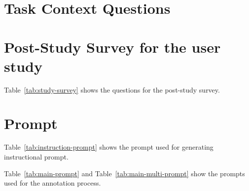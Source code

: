 


% 
% 

% 

\section{\system Task Context Questions}\label{sec:context-question-appendix}


\section{Post-Study Survey for the user study}\label{sec:post-question-survey}
Table~\ref{tab:study-survey} shows the questions for the post-study survey.


\section{Prompt}
Table~\ref{tab:instruction-prompt} shows the prompt \system used for generating instructional prompt.

Table~\ref{tab:main-prompt} and Table~\ref{tab:main-multi-prompt} show the prompts \system used for the annotation process.


